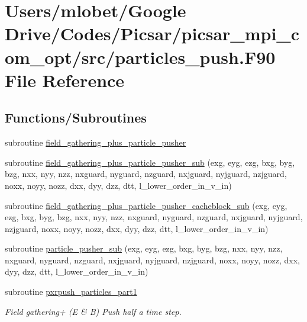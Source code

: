 \hypertarget{particles__push_8_f90}{}\section{Users/mlobet/\+Google Drive/\+Codes/\+Picsar/picsar\+\_\+mpi\+\_\+com\+\_\+opt/src/particles\+\_\+push.F90 File Reference}
\label{particles__push_8_f90}
\subsection*{Functions/\+Subroutines}
\begin{DoxyCompactItemize}
\item 
subroutine \hyperlink{particles__push_8_f90_aba6f2e1d26c95eebe4a184e026c0a3f6}{field\+\_\+gathering\+\_\+plus\+\_\+particle\+\_\+pusher}
\item 
subroutine \hyperlink{particles__push_8_f90_ac0c9813b939a0ef799437c54d49cc947}{field\+\_\+gathering\+\_\+plus\+\_\+particle\+\_\+pusher\+\_\+sub} (exg, eyg, ezg, bxg, byg, bzg, nxx, nyy, nzz,           nxguard, nyguard, nzguard, nxjguard, nyjguard, nzjguard, noxx, noyy,           nozz, dxx, dyy, dzz, dtt, l\+\_\+lower\+\_\+order\+\_\+in\+\_\+v\+\_\+in)
\item 
subroutine \hyperlink{particles__push_8_f90_a59d6ed8231bfda3a4c6d828c848b18ff}{field\+\_\+gathering\+\_\+plus\+\_\+particle\+\_\+pusher\+\_\+cacheblock\+\_\+sub} (exg, eyg, ezg, bxg, byg, bzg, nxx, nyy, nzz, nxguard, nyguard, nzguard, nxjguard, nyjguard, nzjguard, noxx, noyy, nozz, dxx, dyy, dzz, dtt, l\+\_\+lower\+\_\+order\+\_\+in\+\_\+v\+\_\+in)
\item 
subroutine \hyperlink{particles__push_8_f90_ab54fd25981abe6f64d5a146a1a933d24}{particle\+\_\+pusher\+\_\+sub} (exg, eyg, ezg, bxg, byg, bzg, nxx, nyy, nzz, nxguard, nyguard, nzguard, nxjguard, nyjguard, nzjguard, noxx, noyy, nozz, dxx, dyy, dzz, dtt, l\+\_\+lower\+\_\+order\+\_\+in\+\_\+v\+\_\+in)
\item 
subroutine \hyperlink{particles__push_8_f90_a1143d3843261bfef77dc0c9665e947d1}{pxrpush\+\_\+particles\+\_\+part1}
\begin{DoxyCompactList}\small\item\em Field gathering+ (E \& B) Push half a time step. \end{DoxyCompactList}\item 

\end{DoxyCompactItemize}

